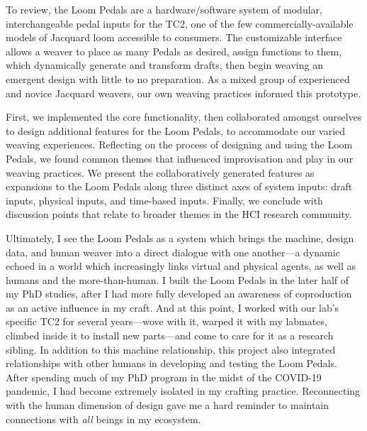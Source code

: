 To review, the Loom Pedals are a hardware/software system of modular, interchangeable pedal inputs for the TC2, one of the few commercially-available models of Jacquard loom accessible to consumers. The customizable interface allows a weaver to place as many Pedals as desired, assign functions to them, which dynamically generate and transform drafts, then begin weaving an emergent design with little to no preparation. As a mixed group of experienced and novice Jacquard weavers, our own weaving practices informed this prototype. 

First, we implemented the core functionality, then collaborated amongst ourselves to design additional features for the Loom Pedals, to accommodate our varied weaving experiences. Reflecting on the process of designing and using the Loom Pedals, we found common themes that influenced improvisation and play in our weaving practices. We present the collaboratively generated features as expansions to the Loom Pedals along three distinct axes of system inputs: draft inputs, physical inputs, and time-based inputs. Finally, we conclude with discussion points that relate to broader themes in the HCI research community. 

Ultimately, I see the Loom Pedals as a system which brings the machine, design data, and human weaver into a direct dialogue with one another---a dynamic echoed in a world which increasingly links virtual and physical agents, as well as humans and the more-than-human. I built the Loom Pedals in the later half of my PhD studies, after I had more fully developed an awareness of coproduction as an active influence in my craft. And at this point, I worked with our lab's specific TC2 for several years---wove with it, warped it with my labmates, climbed inside it to install new parts---and come to care for it as a research sibling. In addition to this machine relationship, this project also integrated relationships with other humans in developing and testing the Loom Pedals. After spending much of my PhD program in the midst of the COVID-19 pandemic, I had become extremely isolated in my crafting practice. Reconnecting with the human dimension of design gave me a hard reminder to maintain connections with \textit{all} beings in my ecosystem.

